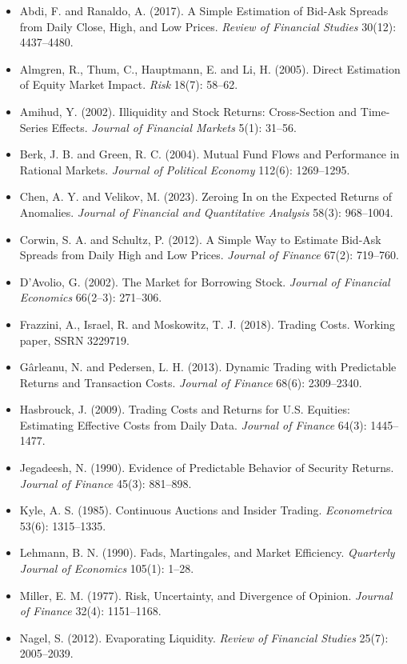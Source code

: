 \begin{itemize}
  \item Abdi, F. and Ranaldo, A. (2017). A Simple Estimation of Bid-Ask Spreads from Daily Close, High, and Low Prices. \emph{Review of Financial Studies} 30(12): 4437--4480.
  \item Almgren, R., Thum, C., Hauptmann, E. and Li, H. (2005). Direct Estimation of Equity Market Impact. \emph{Risk} 18(7): 58--62.
  \item Amihud, Y. (2002). Illiquidity and Stock Returns: Cross-Section and Time-Series Effects. \emph{Journal of Financial Markets} 5(1): 31--56.
  \item Berk, J. B. and Green, R. C. (2004). Mutual Fund Flows and Performance in Rational Markets. \emph{Journal of Political Economy} 112(6): 1269--1295.
  \item Chen, A. Y. and Velikov, M. (2023). Zeroing In on the Expected Returns of Anomalies. \emph{Journal of Financial and Quantitative Analysis} 58(3): 968--1004.
  \item Corwin, S. A. and Schultz, P. (2012). A Simple Way to Estimate Bid-Ask Spreads from Daily High and Low Prices. \emph{Journal of Finance} 67(2): 719--760.
  \item D'Avolio, G. (2002). The Market for Borrowing Stock. \emph{Journal of Financial Economics} 66(2--3): 271--306.
  \item Frazzini, A., Israel, R. and Moskowitz, T. J. (2018). Trading Costs. Working paper, SSRN 3229719.
  \item G\^arleanu, N. and Pedersen, L. H. (2013). Dynamic Trading with Predictable Returns and Transaction Costs. \emph{Journal of Finance} 68(6): 2309--2340.
  \item Hasbrouck, J. (2009). Trading Costs and Returns for U.S. Equities: Estimating Effective Costs from Daily Data. \emph{Journal of Finance} 64(3): 1445--1477.
  \item Jegadeesh, N. (1990). Evidence of Predictable Behavior of Security Returns. \emph{Journal of Finance} 45(3): 881--898.
  \item Kyle, A. S. (1985). Continuous Auctions and Insider Trading. \emph{Econometrica} 53(6): 1315--1335.
  \item Lehmann, B. N. (1990). Fads, Martingales, and Market Efficiency. \emph{Quarterly Journal of Economics} 105(1): 1--28.
  \item Miller, E. M. (1977). Risk, Uncertainty, and Divergence of Opinion. \emph{Journal of Finance} 32(4): 1151--1168.
  \item Nagel, S. (2012). Evaporating Liquidity. \emph{Review of Financial Studies} 25(7): 2005--2039.

\end{itemize}
